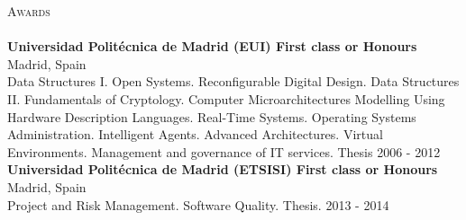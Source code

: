 \documentclass[a4paper]{article}
\newcommand{\lineunder} {
    \vspace*{-8pt} \\
    \hspace*{-18pt} \hrulefill \\
}
\newcommand{\header} [1] {
    {\hspace*{-18pt}\vspace*{6pt} \textsc{#1}}
    \vspace*{-6pt} \lineunder
}
\begin{document}
\vspace*{2mm}

\vspace*{2mm}

\header{Awards}
\textbf{Universidad Polit\'ecnica de Madrid (EUI) First class or Honours} \hfill Madrid, Spain\\
Data Structures I. Open Systems. Reconfigurable Digital Design. Data Structures II. Fundamentals of Cryptology. Computer Microarchitectures Modelling Using Hardware Description Languages. Real-Time Systems. Operating Systems Administration. Intelligent Agents. Advanced Architectures. Virtual Environments. Management and governance of IT services. Thesis \hfill 2006 - 2012\\
\vspace*{2mm}
\textbf{Universidad Polit\'ecnica de Madrid (ETSISI) First class or Honours} \hfill Madrid, Spain\\
Project and Risk Management. Software Quality. Thesis. \hfill 2013 - 2014\\
\vspace*{2mm}

\ 
\end{document}
